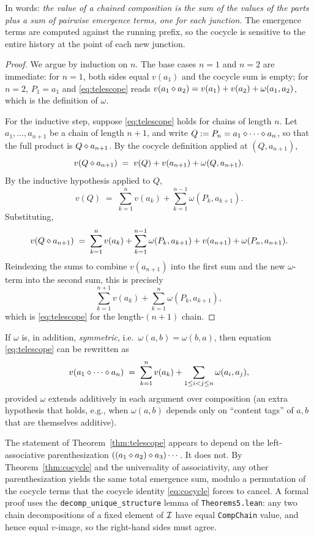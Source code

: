 In words: \emph{the value of a chained composition is the sum of the values
of the parts plus a sum of pairwise emergence terms, one for each
junction.} The emergence terms are computed against the running prefix, so
the cocycle is sensitive to the entire history at the point of each new
junction.

\begin{proof}
We argue by induction on $n$. The base cases $n=1$ and $n=2$ are immediate:
for $n=1$, both sides equal $v(a_1)$ and the cocycle sum is empty; for
$n=2$, $P_1 = a_1$ and \eqref{eq:telescope} reads $v(a_1\mathbin{\diamond} a_2) =
v(a_1) + v(a_2) + \omega(a_1, a_2)$, which is the definition of $\omega$.

For the inductive step, suppose \eqref{eq:telescope} holds for chains of
length $n$. Let $a_1, \dots, a_{n+1}$ be a chain of length $n+1$, and write
$Q := P_n = a_1\mathbin{\diamond}\cdots\mathbin{\diamond} a_n$, so that the full product is
$Q\mathbin{\diamond} a_{n+1}$. By the cocycle definition applied at $(Q, a_{n+1})$,
\[
  v(Q\mathbin{\diamond} a_{n+1}) \;=\; v(Q) + v(a_{n+1}) + \omega(Q, a_{n+1}).
\]
By the inductive hypothesis applied to $Q$,
\[
  v(Q) \;=\; \sum_{k=1}^n v(a_k) + \sum_{k=1}^{n-1} \omega(P_k, a_{k+1}).
\]
Substituting,
\[
  v(Q\mathbin{\diamond} a_{n+1}) \;=\; \sum_{k=1}^n v(a_k) + \sum_{k=1}^{n-1}
  \omega(P_k, a_{k+1}) + v(a_{n+1}) + \omega(P_n, a_{n+1}).
\]
Reindexing the sums to combine $v(a_{n+1})$ into the first sum and the new
$\omega$-term into the second sum, this is precisely
\[
  \sum_{k=1}^{n+1} v(a_k) + \sum_{k=1}^{n} \omega(P_k, a_{k+1}),
\]
which is \eqref{eq:telescope} for the length-$(n+1)$ chain.
\end{proof}

\begin{corollary}\label{cor:tele-sym}
If $\omega$ is, in addition, \emph{symmetric}, i.e.\ $\omega(a,b) =
\omega(b,a)$, then equation \eqref{eq:telescope} can be rewritten as
\[
  v(a_1\mathbin{\diamond}\cdots\mathbin{\diamond} a_n) \;=\; \sum_{k=1}^n v(a_k) + \sum_{1\le i
  < j \le n} \omega(a_i, a_j),
\]
provided $\omega$ extends additively in each argument over composition (an
extra hypothesis that holds, e.g., when $\omega(a,b)$ depends only on
``content tags'' of $a,b$ that are themselves additive).
\end{corollary}

\begin{remark}
The statement of Theorem~\ref{thm:telescope} appears to depend on the
left-associative parenthesization $((a_1\mathbin{\diamond} a_2)\mathbin{\diamond}
a_3)\cdots$. It does not. By Theorem~\ref{thm:cocycle} and the universality
of associativity, any other parenthesization yields the same total emergence
sum, modulo a permutation of the cocycle terms that the cocycle identity
\eqref{eq:cocycle} forces to cancel. A formal proof uses the
\texttt{decomp\_unique\_structure} lemma of \texttt{Theorems5.lean}: any two
chain decompositions of a fixed element of $\mathcal{I}$ have equal
\texttt{CompChain} value, and hence equal $v$-image, so the right-hand sides
must agree.
\end{remark}

